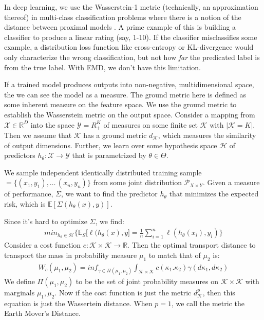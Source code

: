\documentclass[paper=a4, fontsize=12pt]{scrartcl} %
\numberwithin{equation}{section} %
\numberwithin{figure}{section} %
\numberwithin{table}{section} %
\begin{document}
In deep learning, we use the Wasserstein-1 metric (technically, an approximation thereof) in multi-class classification problems where there is a notion 
of the distance between proximal models \cite{wassml}. A prime example of this is building a classifier to produce a linear rating (say, 1-10). If the classifier misclassifies 
some example, a distribution loss function like cross-entropy or KL-divergence would only characterize the wrong classification, but not how \textit{far} the predicated label is from 
the true label. With EMD, we don't have this limitation.

If a trained model produces outputs into non-negative, multidimensional space, the we can see the model as a measure. The ground metric here is defined 
as some inherent measure on the feature space. We use the ground metric to establish the Wasserstein metric on the output space. Consider a mapping 
from $\mathcal{X} \in \mathbb{R}^D$ into the space $\mathcal{Y}=R^K_+$ of measures on some finite set $\mathcal{K}$ with $|\mathcal{K}=K|$. 
Then we assume that $\mathcal{K}$ has a ground metric $d_{\mathcal{K}}$, which measures the similarity of output dimensions. 
Further, we learn over some hypothesis space $\mathcal{H}$ of predictors $h_{\theta} : \mathcal{X} \rightarrow \mathcal{Y}$ that is 
parametrized by $\theta \in \Theta$.

We sample independent identically distributed training sample $ = \{ (x_1, y_1), \ldots\, (x_n, y_n)\}$ from some joint distribution 
$\mathcal{P}_{X \times Y}$. Given a measure of performance, $\Sigma$, we want to find the predictor $h_\theta$ that minimizes the 
expected risk, which is $\mathbb{E}[\Sigma(h_\theta(x), y)]$.

Since it's hard to optimize $\Sigma$, we find:
\begin{align*}
    min_{h_\theta \in \mathcal{H}}\Big\{ \mathbb{E}_S\big[ \ell(h_\theta(x), y \big] = \frac{1}{n}\sum_{i=1}^n \ell(h_\theta(x_i), y_i) \Big\}
\end{align*}
Consider a cost function $c: \mathcal{K} \times \mathcal{K} \rightarrow \mathbb{R}$. Then the optimal transport distance to transport the mass in probability measure $\mu_1$ to match that of $\mu_2$ is:
\begin{align*}
    W_c(\mu_1, \mu_2) = inf_{\gamma \in \Pi(\mu_1, \mu_2)} \int_{\mathcal{K} \times \mathcal{K}} c(\kappa_1. \kappa_2)\gamma(d\kappa_1, d\kappa_2)
\end{align*}
We define $\Pi(\mu_1, \mu_2)$ to be the set of joint probability measures on $\mathcal{K} \times \mathcal{K}$ with marginals $\mu_1, \mu_2$.
Now if the cost function is just the metric $d_\mathcal{K}^p$, then this equation is just the Wassertein distance. When $p=1$, we call the metric the Earth Mover's Distance.
\end{document}
